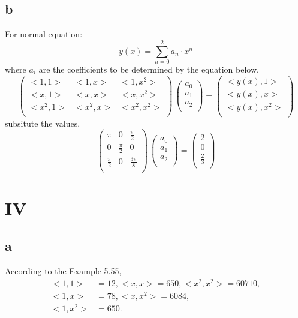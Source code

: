 \documentclass[a4paper]{article}
\begin{document}
\subsection*{b}
For normal equation:
$$y(x) = \sum_{n = 0}^{2}a_{n}\cdot x^{n}$$  
where $a_{i}$ are the coefficients to be determined by the equation below.
$$
\begin{pmatrix}
<1,1> & <1,x> & <1,x^{2}> \\
<x,1> & <x,x> & <x,x^{2}> \\
<x^{2},1> & <x^{2},x> & <x^{2},x^{2}> \\
\end{pmatrix}\,
\begin{pmatrix}
a_{0} \\
a_{1} \\
a_{2} \\
\end{pmatrix}
= \begin{pmatrix}
<y(x),1> \\
<y(x),x> \\
<y(x),x^{2}> \\
\end{pmatrix}
$$
subsitute the values,
$$
\begin{pmatrix}
\pi & 0 & \frac{\pi}{2} \\
0 & \frac{\pi}{2} & 0 \\
\frac{\pi}{2} & 0 & \frac{3\pi}{8} \\
\end{pmatrix}\,
\begin{pmatrix}
a_{0} \\
a_{1} \\
a_{2} \\
\end{pmatrix}
= \begin{pmatrix}
2 \\
0 \\
\frac{2}{3} \\
\end{pmatrix}
$$

\section*{IV}
\subsection*{a}
According to the Example 5.55, 
\begin{align}
    <1,1> &= 12 , <x,x> = 650, <x^{2},x^{2}> = 60710, \\
    <1,x> &= 78, <x,x^{2}> = 6084,  \\
    <1,x^{2}> &= 650.
\end{align}
\end{document}
